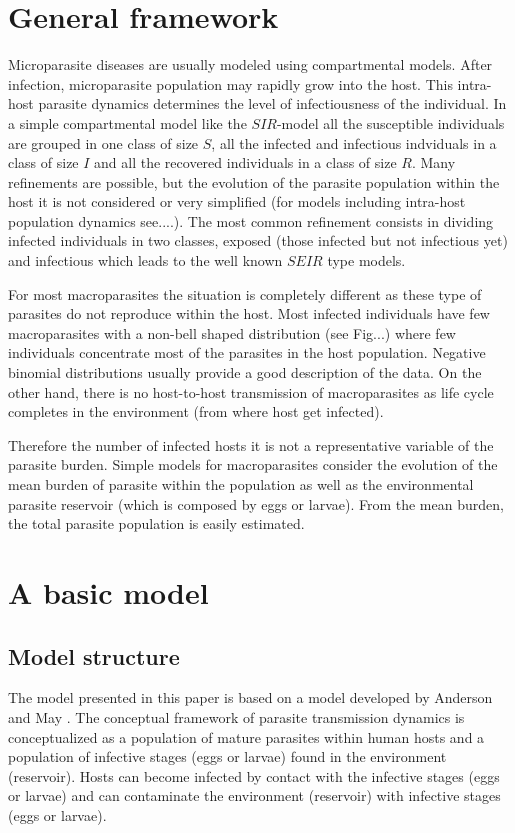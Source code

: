 \documentclass[12pt,a4paper]{article}
\theoremstyle{plain}%
\theoremstyle{definition}
\theoremstyle{remark}
\begin{document}
	
\section{General framework}
	
	
Microparasite diseases are usually modeled using compartmental models. After infection,  microparasite population may rapidly grow into the host. This intra-host parasite dynamics determines the level of infectiousness of the individual. In a simple compartmental  model like the $SIR$-model  all the susceptible individuals are grouped in one class of size $S$, all the infected and infectious indviduals in a class of size $I$ and all the recovered individuals in a class of size $R$. Many refinements are possible, but the evolution of the parasite population within the host it is not considered or very simplified (for models including intra-host population dynamics {\color{red}see....)}. The most common refinement consists in dividing infected individuals in two classes, exposed (those infected but not infectious yet) and infectious which leads to the well known $SEIR$ type models. 


For most macroparasites the situation is completely different as these type of parasites do not reproduce within the host.  Most  infected  individuals have few macroparasites with a non-bell shaped distribution {\color{red}(see Fig...)} where few individuals concentrate most of the parasites in the host population. Negative binomial distributions usually provide a good description of the data. On the other hand, there is no host-to-host transmission of macroparasites as life cycle completes in the environment (from where host get infected).  


Therefore the number of infected hosts it is not a representative variable of the parasite burden. Simple models for macroparasites consider the evolution of the mean burden of parasite within the population as well as the environmental parasite reservoir (which is composed by eggs or larvae). From the mean burden, the total parasite population is easily estimated. 


	
\section{A basic model}
\label{s:basicmodel}
 
\subsection{Model structure}
\label{ss:structure}
The model presented in this paper is based on a model developed by Anderson and May \citep{anderson1992infectious,anderson1985helminth}.
The conceptual framework of parasite transmission dynamics is conceptualized as a population of mature parasites within human hosts and a population of infective stages (eggs or larvae) found in the environment (reservoir).
Hosts can become infected by contact with the infective stages (eggs or larvae) and can contaminate the environment (reservoir) with infective stages (eggs or larvae).
\end{document}

